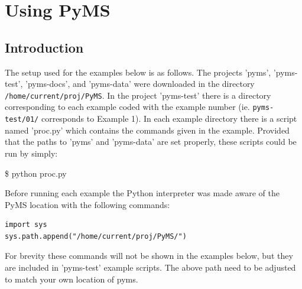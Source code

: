 

\chapter{Using PyMS}

\section{Introduction}

The setup used for the examples below is as follows. The projects 'pyms',
'pyms-test', 'pyms-docs', and 'pyms-data' were downloaded in the directory
{\tt /home/current/proj/PyMS}. In the project 'pyms-test' there is a directory
corresponding to each example coded with the example number (ie.
{\tt pyms-test/01/} corresponds to Example 1). In each example directory
there is a script named 'proc.py' which contains the commands given in
the example. Provided that the paths to 'pyms' and 'pyms-data' are set
properly, these scripts could be run by simply:

\$ python proc.py

Before running each example the Python interpreter was made aware of the
PyMS location with the following commands:

\begin{verbatim}
import sys
sys.path.append("/home/current/proj/PyMS/")
\end{verbatim}

For brevity these commands will not be shown in the examples below, but
they are included in 'pyms-test' example scripts.  The above path need
to be adjusted to match your own location of pyms.

